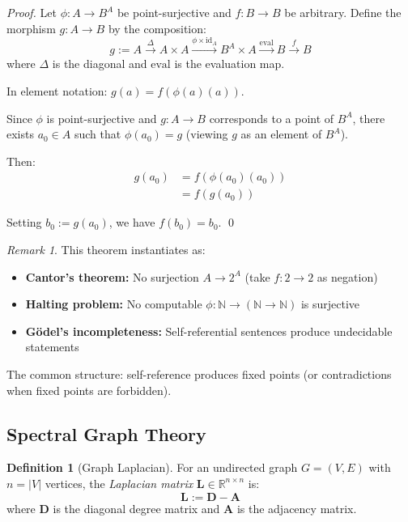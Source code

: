 \documentclass[11pt,a4paper]{article}
\theoremstyle{definition}
\newtheorem{definition}[theorem]{Definition}
\theoremstyle{remark}
\newtheorem{remark}[theorem]{Remark}
\newcommand{\R}{\mathbb{R}}
\newcommand{\N}{\mathbb{N}}
\newcommand{\Lap}{\mathbf{L}}
\newcommand{\Adj}{\mathbf{A}}
\newcommand{\Deg}{\mathbf{D}}
\begin{document}
\begin{proof}
Let $\phi: A \to B^A$ be point-surjective and $f: B \to B$ be arbitrary. Define the morphism $g: A \to B$ by the composition:
\[
g := A \xrightarrow{\Delta} A \times A \xrightarrow{\phi \times \text{id}_A} B^A \times A \xrightarrow{\text{eval}} B \xrightarrow{f} B
\]
where $\Delta$ is the diagonal and $\text{eval}$ is the evaluation map.

In element notation: $g(a) = f(\phi(a)(a))$.

Since $\phi$ is point-surjective and $g: A \to B$ corresponds to a point of $B^A$, there exists $a_0 \in A$ such that $\phi(a_0) = g$ (viewing $g$ as an element of $B^A$).

Then:
\begin{align*}
g(a_0) &= f(\phi(a_0)(a_0)) \\
       &= f(g(a_0))
\end{align*}

Setting $b_0 := g(a_0)$, we have $f(b_0) = b_0$. \qed
\end{proof}

\begin{remark}
This theorem instantiates as:
\begin{itemize}
    \item \textbf{Cantor's theorem:} No surjection $A \to 2^A$ (take $f: 2 \to 2$ as negation)
    \item \textbf{Halting problem:} No computable $\phi: \N \to (\N \to \N)$ is surjective
    \item \textbf{G\"{o}del's incompleteness:} Self-referential sentences produce undecidable statements
\end{itemize}
The common structure: self-reference produces fixed points (or contradictions when fixed points are forbidden).
\end{remark}

\subsection{Spectral Graph Theory}

\begin{definition}[Graph Laplacian]
For an undirected graph $G = (V, E)$ with $n = |V|$ vertices, the \emph{Laplacian matrix} $\Lap \in \R^{n \times n}$ is:
\[
\Lap := \Deg - \Adj
\]
where $\Deg$ is the diagonal degree matrix and $\Adj$ is the adjacency matrix.
\end{definition}
\end{document}
